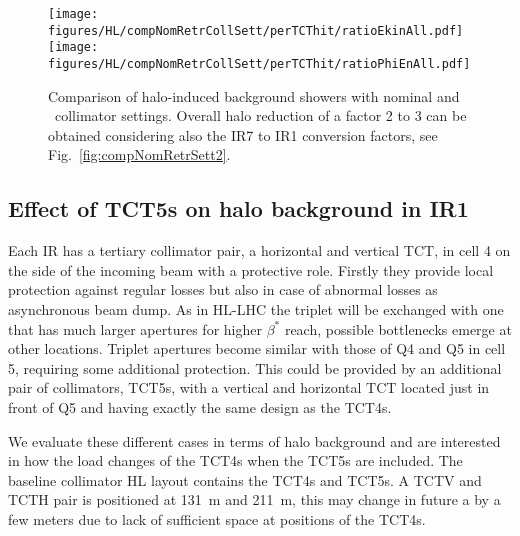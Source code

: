 
\begin{figure}
\begin{center}
\texttt{[image: figures/HL/compNomRetrCollSett/perTCThit/ratioEkinAll.pdf]}
\texttt{[image: figures/HL/compNomRetrCollSett/perTCThit/ratioPhiEnAll.pdf]}
\end{center}
\vspace{-0.6cm}
 \caption{Comparison of halo-induced background showers with nominal and \twosigmaret~collimator settings. Overall halo reduction of a factor 2 to 3 can be obtained considering also the IR7 to IR1 conversion factors, see Fig.~\ref{fig:compNomRetrSett2}.
  \label{fig:compNomRetrSett}}
\end{figure}



\subsection{Effect of TCT5s on halo background in IR1}

Each IR has a tertiary collimator pair, a horizontal and vertical TCT, in cell 4 on the side of the incoming beam with a protective role. Firstly they provide local protection against regular losses but also in case of abnormal losses as asynchronous beam dump. As in HL-LHC the triplet will be exchanged with one that has much larger apertures for higher $\beta^*$ reach, possible bottlenecks emerge at other locations. Triplet apertures become similar with those of Q4 and Q5 in cell 5, requiring some additional protection. This could be provided by an additional pair of collimators, TCT5s, with a vertical and horizontal TCT located just in front of Q5 and having exactly the same design as the TCT4s.

We evaluate these different cases in terms of halo background and are interested in how the load changes of the TCT4s when the TCT5s are included. The baseline collimator HL layout contains the TCT4s and TCT5s. A TCTV and TCTH pair is positioned at 131~m and 211~m, this may change in future a by a few meters due to lack of sufficient space at positions of the TCT4s.

